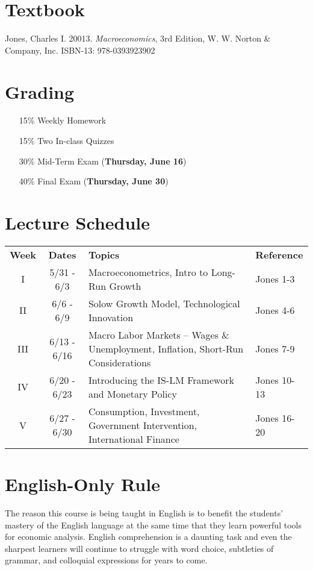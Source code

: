 \documentclass{article}
\begin{document}
\section*{Textbook}

Jones, Charles I. 20013. \textit{Macroeconomics}, 3rd Edition, W. W. Norton \& Company, Inc. ISBN-13: 978-0393923902

\section*{Grading}

\begin{itemize}
\item [15\%] Weekly Homework
\item [15\%] Two In-class Quizzes
\item [30\%] Mid-Term Exam (\textbf{Thursday, June 16})
\item [40\%] Final Exam (\textbf{Thursday, June 30})
\end{itemize}

\section*{Lecture Schedule}

\begin{table}[h]
\centering
\begin{tabular}{c c p{6cm} l}
\textbf{Week} & \textbf{Dates} & \textbf{Topics} & \textbf{Reference} \\
I & 5/31 - 6/3 & Macroeconometrics, Intro to Long-Run Growth & Jones 1-3 \\
II & 6/6 - 6/9 & Solow Growth Model, Technological Innovation & Jones 4-6 \\
III & 6/13 - 6/16 & Macro Labor Markets -- Wages \& Unemployment, Inflation, Short-Run Considerations & Jones 7-9 \\
IV & 6/20 - 6/23 & Introducing the IS-LM Framework and Monetary Policy & Jones 10-13 \\ 
V & 6/27 - 6/30 & Consumption, Investment, Government Intervention, International Finance & Jones 16-20 \\
\end{tabular}
\end{table}

\section*{English-Only Rule}
The reason this course is being taught in English is to benefit the students' mastery of the English language at the same time that they learn powerful tools for economic analysis. English comprehension is a daunting task and even the sharpest learners will continue to struggle with word choice, subtleties of grammar, and colloquial expressions for years to come.
\end{document}
